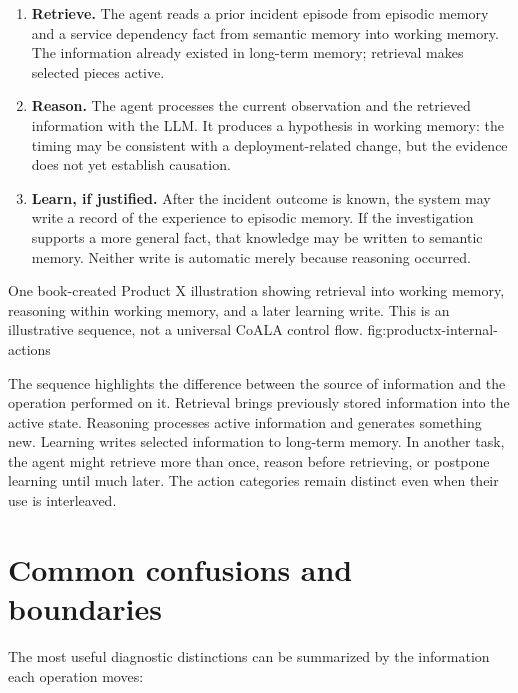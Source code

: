 \begin{enumerate}
  \item \textbf{Retrieve.} The agent reads a prior incident episode from episodic memory and a service dependency fact from semantic memory into working memory. The information already existed in long-term memory; retrieval makes selected pieces active.
  \item \textbf{Reason.} The agent processes the current observation and the retrieved information with the LLM. It produces a hypothesis in working memory: the timing may be consistent with a deployment-related change, but the evidence does not yet establish causation.
  \item \textbf{Learn, if justified.} After the incident outcome is known, the system may write a record of the experience to episodic memory. If the investigation supports a more general fact, that knowledge may be written to semantic memory. Neither write is automatic merely because reasoning occurred.
\end{enumerate}

  {One book-created Product X illustration showing retrieval into working memory, reasoning within working memory, and a later learning write. This is an illustrative sequence, not a universal CoALA control flow.}
  {fig:productx-internal-actions}

The sequence highlights the difference between the source of information and the operation performed on it. Retrieval brings previously stored information into the active state. Reasoning processes active information and generates something new. Learning writes selected information to long-term memory. In another task, the agent might retrieve more than once, reason before retrieving, or postpone learning until much later. The action categories remain distinct even when their use is interleaved.

\section{Common confusions and boundaries}
\label{sec:internal-action-boundaries}

The most useful diagnostic distinctions can be summarized by the information each operation moves:


